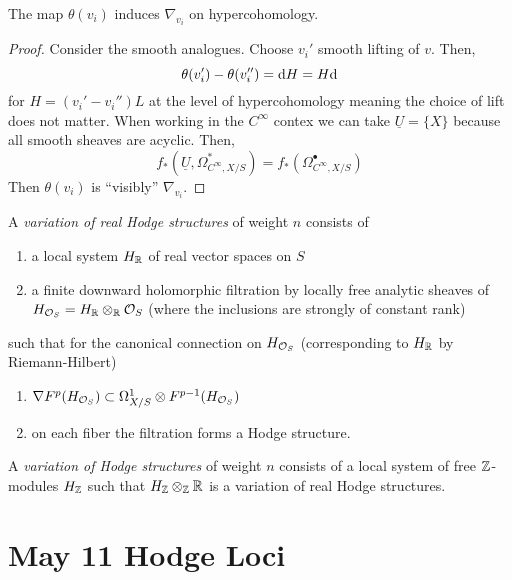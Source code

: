 \documentclass[12pt]{article}
\begin{document}
\begin{lemma}
The map $\theta(v_i)$ induces $\nabla_{v_i}$ on hypercohomology.
\end{lemma}

\begin{proof}
Consider the smooth analogues. Choose $v_i'$ smooth lifting of $v$. Then,
\[ \theta(v_i') - \theta(v_i'') = \mathrm{d}{H} = H \mathrm{d}{} \]
for $H = (v_i' - v_i'') L$ at the level of hypercohomology meaning the choice of lift does not matter. When working in the $C^\infty$ contex we can take $\underline{U} = \{ X \}$ because all smooth sheaves are acyclic. Then,
\[ f_* (\underline{U}, \Omega^*_{C^\infty, X/S}) = f_* (\Omega^\bullet_{C^\infty, X/S}) \]
Then $\theta(v_i)$ is ``visibly'' $\nabla_{v_i}$. 
\end{proof}

\begin{defn}
A \textit{variation of real Hodge structures} of weight $n$ consists of
\begin{enumerate}
\item a local system $H_{\mathbb{R}}$ of real vector spaces on $S$ 
\item a finite downward holomorphic filtration by locally free analytic sheaves of $H_{\mathcal{O}_{S}} = H_{\mathbb{R}} \otimes_{\mathbb{R}} \mathcal{O}_{S}$ (where the inclusions are strongly of constant rank)
\end{enumerate}
such that for the canonical connection on $H_{\mathcal{O}_{S}}$ (corresponding to $H_{\mathbb{R}}$ by Riemann-Hilbert)
\begin{enumerate}
\item $\nabla F^p(H_{\mathcal{O}_{S}}) \subset \Omega^1_{X/S} \otimes F^{p-1}(H_{\mathcal{O}_{S}})$
\item on each fiber the filtration forms a Hodge structure. 
\end{enumerate}
A \textit{variation of Hodge structures} of weight $n$ consists of a local system of free $\mathbb{Z}$-modules $H_{\mathbb{Z}}$ such that $H_{\mathbb{Z}} \otimes_{\mathbb{Z}} \mathbb{R}$ is a variation of real Hodge structures. 
\end{defn}

\section{May 11 Hodge Loci}
\end{document}
